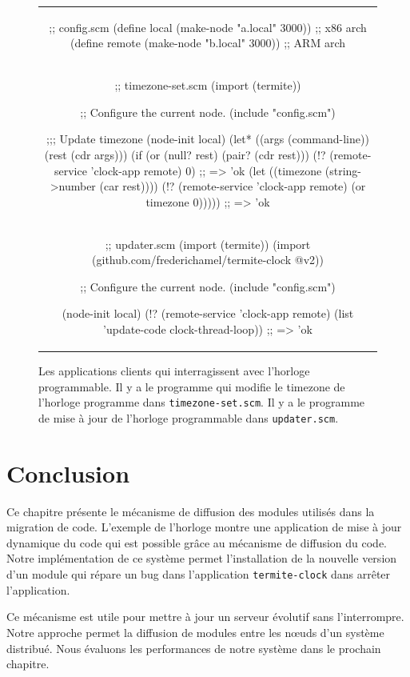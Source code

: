 \begin{figure}[ht]
  \centering\fontsize{12}{8}
  \begin{tabular}{c}
\begin{mplisting}{1}
;; config.scm
(define local    (make-node "a.local" 3000)) ;; x86 arch
(define remote   (make-node "b.local" 3000)) ;; ARM arch
\end{mplisting}\\[5ex]
\begin{mplisting}{1}
;; timezone-set.scm
(import (termite))

;; Configure the current node.
(include "config.scm")

;;; Update timezone
(node-init local)
(let* ((args (command-line))
       (rest (cdr args)))
  (if (or (null? rest)
          (pair? (cdr rest)))
      (!? (remote-service 'clock-app remote) 0) ;; => 'ok
      (let ((timezone (string->number (car rest))))
        (!? (remote-service 'clock-app remote) (or timezone 0))))) ;; => 'ok
\end{mplisting}\\[5ex]
\begin{mplisting}{1}
;; updater.scm
(import (termite))
(import (github.com/frederichamel/termite-clock @v2))

;; Configure the current node.
(include "config.scm")

(node-init local)
(!? (remote-service 'clock-app remote)
    (list 'update-code clock-thread-loop)) ;; => 'ok
\end{mplisting}
  \end{tabular}
  \caption{Les applications clients qui interragissent avec
    l'horloge programmable. Il y a le programme qui modifie
    le timezone de l'horloge programme dans \texttt{timezone-set.scm}.
    Il y a le programme de mise à jour de l'horloge programmable
    dans \texttt{updater.scm}.}
  \vspace*{4ex}
  \label{fig:termite_clock_client}
\end{figure}

\section{Conclusion}
Ce chapitre présente le mécanisme de diffusion des modules utilisés
dans la migration de code. L'exemple de l'horloge montre une application
de mise à jour dynamique du code qui est possible grâce au mécanisme
de diffusion du code. Notre implémentation de ce système permet l'installation
de la nouvelle version d'un module qui répare un bug dans l'application
\texttt{termite-clock} dans arrêter l'application.

Ce mécanisme est utile pour mettre à jour un serveur évolutif sans
l'interrompre. Notre approche permet la diffusion de modules entre les nœuds
d'un système distribué. Nous évaluons les performances de notre
système dans le prochain chapitre.
